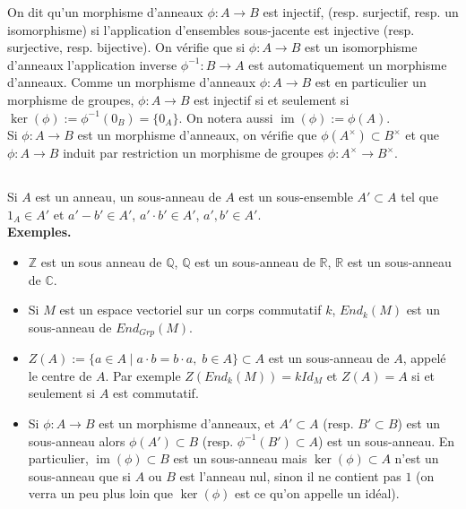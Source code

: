 \documentclass[a4paper, oneside, 12pt]{book}
\theoremstyle{theoremeStyle} %
\theoremstyle{definition} %
\DeclareMathOperator{\im}{im}
\newcommand{\Q}{\mathbb{Q}}
\newcommand{\C}{\mathbb{C}}
\newcommand{\Z}{\mathbb{Z}}
\newcommand{\R}{\mathbb{R}}
\begin{document}
 On dit qu'un morphisme d'anneaux $\phi:A\rightarrow B$ est injectif, (resp. surjectif, resp. un isomorphisme) si l'application d'ensembles sous-jacente est injective (resp. surjective, resp. bijective). On vérifie que si $\phi:A\rightarrow B$ est un isomorphisme d'anneaux l'application inverse $\phi^{-1}:B\rightarrow A$ est automatiquement un morphisme d'anneaux. Comme un morphisme d'anneaux $\phi:A\rightarrow B$ est en particulier un morphisme de groupes, $\phi:A\rightarrow B$ est injectif si et seulement si $\ker(\phi):=\phi^{-1}(0_B)=\lbrace 0_A\rbrace$. On notera aussi $\im(\phi):=\phi(A)$. \\

 Si $\phi:A\rightarrow B$ est un morphisme d'anneaux, on vérifie que $\phi(A^\times)\subset B^\times$ et que $\phi:A\rightarrow B$ induit par restriction un morphisme de groupes $\phi:A^\times\rightarrow B^\times$.

\subsection{}Si $A$ est un anneau, un sous-anneau de $A$ est un sous-ensemble $A'\subset A$ tel que $1_A\in A'$ et $a'-b'\in A'$, $a'\cdot b'\in A'$, $a',b'\in A'$. \\

\textbf{Exemples.}
\begin{itemize}[leftmargin=* ,parsep=0cm,itemsep=0cm,topsep=0cm]
\item $\Z$ est un sous anneau de $\Q$, $\Q$ est un sous-anneau de $\R$, $\R$ est un sous-anneau de $\C$.
\item Si $M$ est un espace vectoriel sur un corps commutatif $k$, $End_k(M)$ est un sous-anneau de $End_{Grp}(M)$.
\item $Z(A):=\lbrace a\in A\;|\; a\cdot b=b\cdot a,\; b\in A\rbrace\subset A$ est un sous-anneau de $A$, appelé le centre de $A$. Par exemple $Z(End_k(M))=kId_M$ et $Z(A)=A$ si et seulement si $A$ est commutatif.
\item Si $\phi:A\rightarrow B$ est un morphisme d'anneaux, et $A'\subset A$ (resp. $B'\subset B$) est un sous-anneau alors $\phi(A')\subset B$ (resp. $\phi^{-1}(B')\subset A$) est un sous-anneau. En particulier, $\im(\phi)\subset B$ est un sous-anneau mais  $\ker(\phi)\subset A$ n'est un sous-anneau que si $A$ ou $B$ est l'anneau nul, sinon il ne contient pas $1$ (on verra un peu plus loin que $\ker(\phi)$ est ce qu'on appelle un idéal).
\end{itemize}
\end{document}
